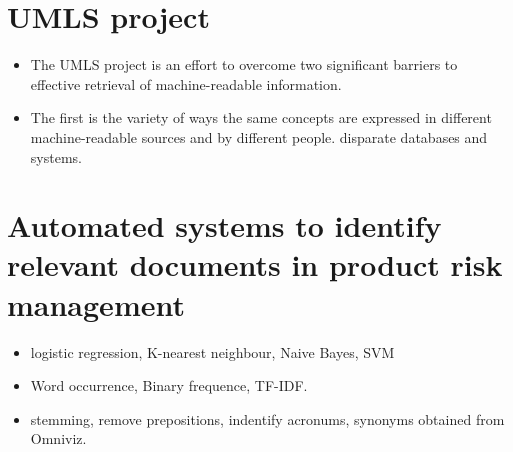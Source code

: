 \documentclass[pdftext,twoside,11pt]{article}
\begin{document}
\section{UMLS project}
\label{sec:intro} 
\begin{itemize}
\item The UMLS project is an effort to overcome two significant
 barriers to effective retrieval of machine-readable information. 
\item  The first is the variety of ways the same concepts are expressed
        in different machine-readable sources and by different people. disparate databases and systems.
\end{itemize}

\section{Automated systems to identify relevant
documents in product risk management}
\label{sec:intro} 
\begin{itemize}
\item  logistic regression, K-nearest neighbour, Naive Bayes, SVM
\item  Word occurrence, Binary frequence, TF-IDF. 
\item  stemming, remove prepositions, indentify acronums, synonyms obtained from Omniviz.
\end{itemize}
\end{document}
